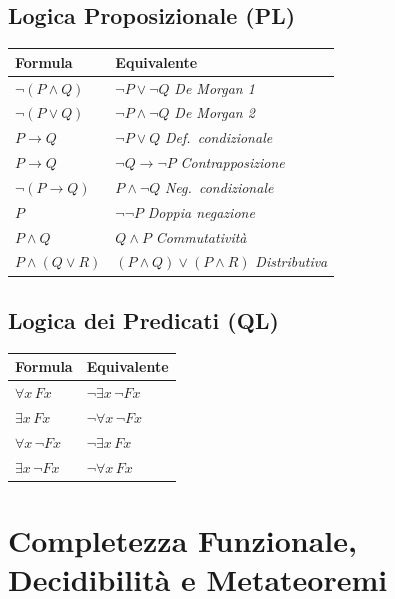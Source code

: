 \documentclass[10pt,a4paper]{article}
\begin{document}
\subsection{Logica Proposizionale (PL)}

\renewcommand{\arraystretch}{1.3}
\begin{tabular}{@{}ll@{}}
  \toprule
  \textbf{Formula} & \textbf{Equivalente} \\
  \midrule
  $\lnot(P \land Q)$ & $\lnot P \lor \lnot Q$ \hfill \textit{De Morgan 1} \\
  $\lnot(P \lor Q)$ & $\lnot P \land \lnot Q$ \hfill \textit{De Morgan 2} \\
  $P \to Q$ & $\lnot P \lor Q$ \hfill \textit{Def.\ condizionale} \\
  $P \to Q$ & $\lnot Q \to \lnot P$ \hfill \textit{Contrapposizione} \\
  $\lnot(P \to Q)$ & $P \land \lnot Q$ \hfill \textit{Neg.\ condizionale} \\
  $P$ & $\lnot\lnot P$ \hfill \textit{Doppia negazione} \\
  $P \land Q$ & $Q \land P$ \hfill \textit{Commutatività} \\
  $P \land (Q \lor R)$ & $(P \land Q) \lor (P \land R)$ \hfill \textit{Distributiva} \\
  \bottomrule
\end{tabular}

\subsection{Logica dei Predicati (QL)}

\begin{tabular}{@{}ll@{}}
  \toprule
  \textbf{Formula} & \textbf{Equivalente} \\
  \midrule
  $\forall x\, Fx$ & $\lnot\exists x\, \lnot Fx$ \\
  $\exists x\, Fx$ & $\lnot\forall x\, \lnot Fx$ \\
  $\forall x\, \lnot Fx$ & $\lnot\exists x\, Fx$ \\
  $\exists x\, \lnot Fx$ & $\lnot\forall x\, Fx$ \\
  \bottomrule
\end{tabular}

\newpage
\section{Completezza Funzionale, Decidibilità e Metateoremi}
\end{document}
